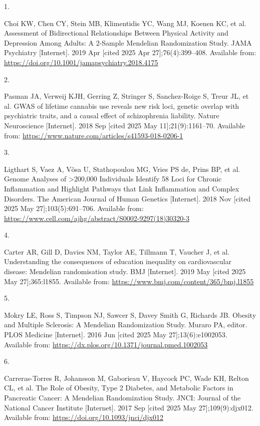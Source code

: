 \documentclass[
]{article}
\newlength{\cslhangindent}
\newlength{\csllabelwidth}
\newenvironment{CSLReferences}[2] %
 {\begin{list}{}{%
  \setlength{\itemindent}{0pt}
  \setlength{\leftmargin}{0pt}
  \setlength{\parsep}{0pt}
  \ifodd #1
   \setlength{\leftmargin}{\cslhangindent}
   \setlength{\itemindent}{-1\cslhangindent}
  \fi
  \setlength{\itemsep}{#2\baselineskip}}}
 {\end{list}}
\newcommand{\CSLLeftMargin}[1]{\parbox[t]{\csllabelwidth}{\strut#1\strut}}
\newcommand{\CSLRightInline}[1]{\parbox[t]{\linewidth - \csllabelwidth}{\strut#1\strut}}
\begin{document}
\label{refs}
\begin{CSLReferences}{0}{1}
\CSLLeftMargin{1. }%
\CSLRightInline{Choi KW, Chen CY, Stein MB, Klimentidis YC, Wang MJ, Koenen KC, et al. Assessment of {Bidirectional} {Relationships} {Between} {Physical} {Activity} and {Depression} {Among} {Adults}: {A} 2-{Sample} {Mendelian} {Randomization} {Study}. JAMA Psychiatry {[}Internet{]}. 2019 Apr {[}cited 2025 Apr 27{]};76(4):399--408. Available from: \url{https://doi.org/10.1001/jamapsychiatry.2018.4175}}

\CSLLeftMargin{2. }%
\CSLRightInline{Pasman JA, Verweij KJH, Gerring Z, Stringer S, Sanchez-Roige S, Treur JL, et al. {GWAS} of lifetime cannabis use reveals new risk loci, genetic overlap with psychiatric traits, and a causal effect of schizophrenia liability. Nature Neuroscience {[}Internet{]}. 2018 Sep {[}cited 2025 May 11{]};21(9):1161--70. Available from: \url{https://www.nature.com/articles/s41593-018-0206-1}}

\CSLLeftMargin{3. }%
\CSLRightInline{Ligthart S, Vaez A, Võsa U, Stathopoulou MG, Vries PS de, Prins BP, et al. Genome {Analyses} of {\textgreater{}}200,000 {Individuals} {Identify} 58 {Loci} for {Chronic} {Inflammation} and {Highlight} {Pathways} that {Link} {Inflammation} and {Complex} {Disorders}. The American Journal of Human Genetics {[}Internet{]}. 2018 Nov {[}cited 2025 May 27{]};103(5):691--706. Available from: \url{https://www.cell.com/ajhg/abstract/S0002-9297(18)30320-3}}

\CSLLeftMargin{4. }%
\CSLRightInline{Carter AR, Gill D, Davies NM, Taylor AE, Tillmann T, Vaucher J, et al. Understanding the consequences of education inequality on cardiovascular disease: Mendelian randomisation study. BMJ {[}Internet{]}. 2019 May {[}cited 2025 May 27{]};365:l1855. Available from: \url{https://www.bmj.com/content/365/bmj.l1855}}

\CSLLeftMargin{5. }%
\CSLRightInline{Mokry LE, Ross S, Timpson NJ, Sawcer S, Davey Smith G, Richards JB. Obesity and {Multiple} {Sclerosis}: {A} {Mendelian} {Randomization} {Study}. Muraro PA, editor. PLOS Medicine {[}Internet{]}. 2016 Jun {[}cited 2025 May 27{]};13(6):e1002053. Available from: \url{https://dx.plos.org/10.1371/journal.pmed.1002053}}

\CSLLeftMargin{6. }%
\CSLRightInline{Carreras-Torres R, Johansson M, Gaborieau V, Haycock PC, Wade KH, Relton CL, et al. The {Role} of {Obesity}, {Type} 2 {Diabetes}, and {Metabolic} {Factors} in {Pancreatic} {Cancer}: {A} {Mendelian} {Randomization} {Study}. JNCI: Journal of the National Cancer Institute {[}Internet{]}. 2017 Sep {[}cited 2025 May 27{]};109(9):djx012. Available from: \url{https://doi.org/10.1093/jnci/djx012}}


\end{CSLReferences}
\end{document}
